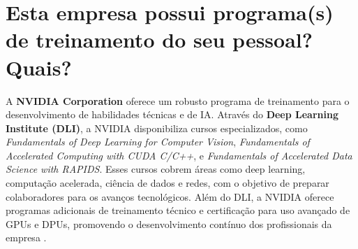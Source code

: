 \section{Esta empresa possui programa(s) de treinamento do seu pessoal? Quais?}

A \textbf{NVIDIA Corporation} oferece um robusto programa de treinamento para o desenvolvimento de habilidades técnicas e de IA. Através do \textbf{Deep Learning Institute (DLI)}, a NVIDIA disponibiliza cursos especializados, como \textit{Fundamentals of Deep Learning for Computer Vision}, \textit{Fundamentals of Accelerated Computing with CUDA C/C++}, e \textit{Fundamentals of Accelerated Data Science with RAPIDS}. Esses cursos cobrem áreas como deep learning, computação acelerada, ciência de dados e redes, com o objetivo de preparar colaboradores para os avanços tecnológicos. Além do DLI, a NVIDIA oferece programas adicionais de treinamento técnico e certificação para uso avançado de GPUs e DPUs, promovendo o desenvolvimento contínuo dos profissionais da empresa \cite{nvidia_training, nvidia_dli}.

